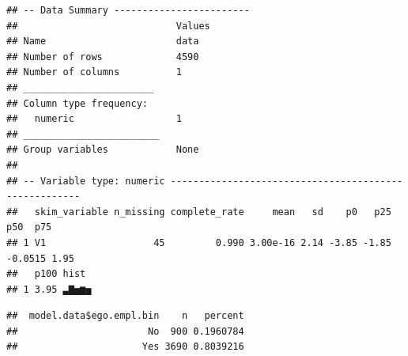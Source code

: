\documentclass[
]{book}
\newenvironment{Shaded}{\begin{snugshade}}{\end{snugshade}}
\newcommand{\CommentTok}[1]{\textcolor[rgb]{0.56,0.35,0.01}{\textit{#1}}}
\newcommand{\DocumentationTok}[1]{\textcolor[rgb]{0.56,0.35,0.01}{\textbf{\textit{#1}}}}
\newcommand{\FunctionTok}[1]{\textcolor[rgb]{0.00,0.00,0.00}{#1}}
\newcommand{\NormalTok}[1]{#1}
\newcommand{\SpecialCharTok}[1]{\textcolor[rgb]{0.00,0.00,0.00}{#1}}
\begin{document}
\begin{Shaded}
\end{Shaded}

\begin{verbatim}
## -- Data Summary ------------------------
##                            Values
## Name                       data  
## Number of rows             4590  
## Number of columns          1     
## _______________________          
## Column type frequency:           
##   numeric                  1     
## ________________________         
## Group variables            None  
## 
## -- Variable type: numeric ------------------------------------------------------
##   skim_variable n_missing complete_rate     mean   sd    p0   p25     p50  p75
## 1 V1                   45         0.990 3.00e-16 2.14 -3.85 -1.85 -0.0515 1.95
##   p100 hist 
## 1 3.95 ▃▇▅▆▅
\end{verbatim}

\begin{Shaded}
\end{Shaded}

\begin{verbatim}
##  model.data$ego.empl.bin    n   percent
##                       No  900 0.1960784
##                      Yes 3690 0.8039216
\end{verbatim}

\begin{Shaded}
\end{Shaded}
\end{document}
